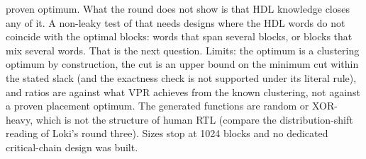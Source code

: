 proven optimum. What the round does not show is that HDL knowledge closes any of it. A non-leaky test of that needs designs where the HDL words do not coincide with the optimal blocks: words that span several blocks, or blocks that mix several words. That is the next question. Limits: the optimum is a clustering optimum by construction, the cut is an upper bound on the minimum cut within the stated slack (and the exactness check is not supported under its literal rule), and ratios are against what VPR achieves from the known clustering, not against a proven placement optimum. The generated functions are random or XOR-heavy, which is not the structure of human RTL (compare the distribution-shift reading of Loki's round three). Sizes stop at 1024 blocks and no dedicated critical-chain design was built.
